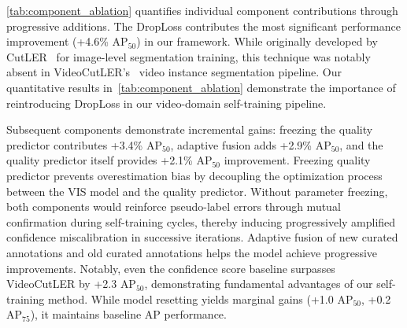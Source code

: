 \cref{tab:component_ablation} quantifies individual component contributions through progressive additions. The DropLoss contributes the most significant performance improvement (+4.6\% $\text{AP}_{50}$) in our framework. While originally developed by CutLER~\cite{cutler} for image-level segmentation training, this technique was notably absent in VideoCutLER's~\cite{videocutler} video instance segmentation pipeline. Our quantitative results in~\cref{tab:component_ablation} demonstrate the importance of reintroducing DropLoss in our video-domain self-training pipeline.

Subsequent components demonstrate incremental gains: freezing the quality predictor contributes +3.4\% $\text{AP}_{50}$, adaptive fusion adds +2.9\% $\text{AP}_{50}$, and the quality predictor itself provides +2.1\% $\text{AP}_{50}$ improvement. 
Freezing quality predictor prevents overestimation bias by decoupling the optimization process between the VIS model and the quality predictor. Without parameter freezing, both components would reinforce pseudo-label errors through mutual confirmation during self-training cycles, thereby inducing progressively amplified confidence miscalibration in successive iterations. 
Adaptive fusion of new curated annotations and old curated annotations helps the model achieve progressive improvements.
Notably, even the confidence score baseline surpasses VideoCutLER by +2.3 $\text{AP}_{50}$, demonstrating fundamental advantages of our self-training method. While model resetting yields marginal gains (+1.0 $\text{AP}_{50}$, +0.2 $\text{AP}_{75}$), it maintains baseline $\text{AP}$ performance.  

